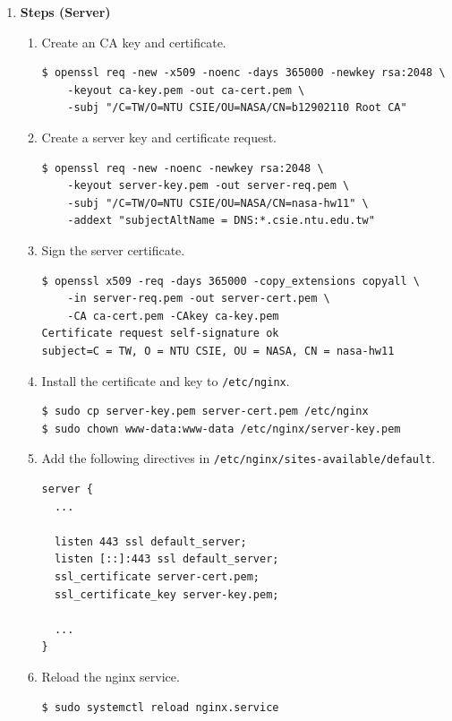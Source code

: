 \documentclass[12pt, a4paper]{article}
\begin{document}
\begin{enumerate}[resume]
    \begin{enumerate}[resume]
      \item \textbf{Steps (Server)}
      \begin{enumerate}[label=(\arabic*)]
        \item Create an CA key and certificate.
        \begin{Verbatim}[frame=single]
$ openssl req -new -x509 -noenc -days 365000 -newkey rsa:2048 \
    -keyout ca-key.pem -out ca-cert.pem \
    -subj "/C=TW/O=NTU CSIE/OU=NASA/CN=b12902110 Root CA"
        \end{Verbatim}
        \item Create a server key and certificate request.
        \begin{Verbatim}[frame=single]
$ openssl req -new -noenc -newkey rsa:2048 \
    -keyout server-key.pem -out server-req.pem \
    -subj "/C=TW/O=NTU CSIE/OU=NASA/CN=nasa-hw11" \
    -addext "subjectAltName = DNS:*.csie.ntu.edu.tw"
        \end{Verbatim}
        \item Sign the server certificate.
        \begin{Verbatim}[frame=single]
$ openssl x509 -req -days 365000 -copy_extensions copyall \
    -in server-req.pem -out server-cert.pem \
    -CA ca-cert.pem -CAkey ca-key.pem
Certificate request self-signature ok
subject=C = TW, O = NTU CSIE, OU = NASA, CN = nasa-hw11
        \end{Verbatim}

        \item Install the certificate and key to \verb|/etc/nginx|.
        \begin{Verbatim}[frame=single]
$ sudo cp server-key.pem server-cert.pem /etc/nginx
$ sudo chown www-data:www-data /etc/nginx/server-key.pem
        \end{Verbatim}
        \item Add the following directives in \verb|/etc/nginx/sites-available/default|.
        \begin{Verbatim}[frame=single]
server {
  ...

  listen 443 ssl default_server;
  listen [::]:443 ssl default_server;
  ssl_certificate server-cert.pem;
  ssl_certificate_key server-key.pem;

  ...
}
        \end{Verbatim}
        \item Reload the nginx service.
        \begin{Verbatim}[frame=single]
$ sudo systemctl reload nginx.service
        \end{Verbatim}
      \end{enumerate}


\end{enumerate}
\end{enumerate}
\end{document}
